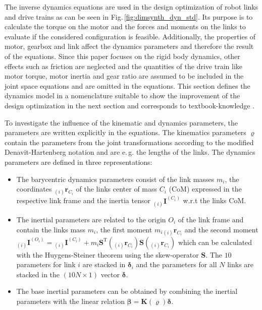 \documentclass{svproc}
\newcommand{\bm}[1]{\boldsymbol{#1}}
\newcommand{\ortvek}[4]{{ }_{(#1)}{\boldsymbol{#2}}^{#3}_{#4} }
\newcommand{\transp}[0]{{\mathrm{T}}}
\begin{document}
The inverse dynamics equations are used in the design optimization of robot links and drive trains as can be seen in Fig.\,\ref{fig:dimsynth_dyn_std}.
Its purpose is to calculate the torque on the motor and the forces and moments on the links to evaluate if the considered configuration is feasible.
Additionally, the properties of motor, gearbox and link affect the dynamics parameters and therefore the result of the equations.
Since this paper focuses on the rigid body dynamics, other effects such as friction are neglected and the quantities of the drive train like motor torque, motor inertia and gear ratio are assumed to be included in the joint space equations and are omitted in the equations.
This section defines the dynamics model in a nomenclature suitable to show the improvement of the design optimization in the next section and corresponds to textbook-knowledge \cite{KhalilDom2002}.

To investigate the influence of the kinematic and dynamics parameters, the parameters are written explicitly in the equations.
The kinematics parameters $\bm{\varrho}$ contain the parameters from the joint transformations according to the modified Denavit-Hartenberg notation and are e.\,g. the lengths of the links.
%
The dynamics parameters are defined in three representations:
\begin{itemize}
\item The barycentric dynamics parameters consist of the link masses $m_i$, the coordinates $\ortvek{i}{r}{}{C_i}$ of the links center of mass $C_i$ (CoM)  expressed in the respective link frame and the inertia tensor $\ortvek{i}{I}{(C_i)}{}$ w.r.t the links CoM. 
\item The inertial parameters are related to the origin $O_i$ of the link frame and contain the links mass $m_i$, the first moment $m_i \ortvek{i}{r}{}{C_i}$ and the second moment $\ortvek{i}{I}{(O_i)}{}=\ortvek{i}{I}{(C_i)}{}+m_i\bm{S}^\transp(\ortvek{i}{r}{}{C_i})\bm{S}(\ortvek{i}{r}{}{C_i})$ which can be calculated with the Huygens-Steiner theorem using the skew-operator $\bm{S}$.
The $10$ parameters for link $i$ are stacked in $\bm{\delta}_i$ and the parameters for all $N$ links are stacked in the $(10N \times 1)$ vector $\bm{\delta}$.
\item The base inertial parameters can be obtained by combining the inertial parameters with the linear relation $\bm{\beta}=\bm{K}(\bm{\varrho})\bm{\delta}$.
\end{itemize}
%
\end{document}
